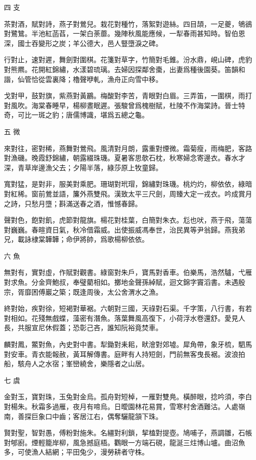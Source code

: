 \documentclass[12pt,a4paper]{ctexbook}
\begin{document}
四 支\par
茶對酒，賦對詩，燕子對鶯兒。栽花對種竹，落絮對遊絲。四目頡，一足夔，鴝鵒對鷺鷥。半池紅菡萏，一架白荼蘼。幾陣秋風能應候，一犁春雨甚知時。智伯恩深，國士吞變形之炭；羊公德大，邑人豎墮淚之碑。\par
行對止，速對遲，舞劍對圍棋。花箋對草字，竹簡對毛錐。汾水鼎，峴山碑，虎豹對熊羆。花開紅錦繡，水漾碧琉璃。去婦因探鄰舍棗，出妻爲種後園葵。笛韻和諧，仙管恰從雲裏降；櫓聲咿軋，漁舟正向雪中移。\par
戈對甲，鼓對旗，紫燕對黃鸝。梅酸對李苦，青眼對白眉。三弄笛，一圍棋，雨打對風吹。海棠春睡早，楊柳晝眠遲。張駿曾爲槐樹賦，杜陵不作海棠詩。晉士特奇，可比一斑之豹；唐儒博識，堪爲五總之龜。\par
五 微\par
來對往，密對稀，燕舞對鶯飛。風清對月朗，露重對煙微。霜菊瘦，雨梅肥，客路對漁磯。晚霞舒錦繡，朝露綴珠璣。夏暑客思欹石枕，秋寒婦念寄邊衣。春水才深，青草岸邊漁父去；夕陽半落，綠莎原上牧童歸。\par
寬對猛，是對非，服美對乘肥。珊瑚對玳瑁，錦繡對珠璣。桃灼灼，柳依依，綠暗對紅稀。窗前鶯並語，簾外燕雙飛。漢致太平三尺劍，周臻大定一戎衣。吟成賞月之詩，只愁月墮；斟滿送春之酒，惟憾春歸。\par
聲對色，飽對飢，虎節對龍旗。楊花對桂葉，白簡對朱衣。尨也吠，燕于飛，蕩蕩對巍巍。春暄資日氣，秋冷借霜威。出使振威馮奉世，治民異等尹翁歸。燕我弟兄，載詠棣棠韡韡；命伊將帥，爲歌楊柳依依。\par
六 魚\par
無對有，實對虛，作賦對觀書。綠窗對朱戶，寶馬對香車。伯樂馬，浩然驢，弋雁對求魚。分金齊鮑叔，奉璧藺相如。擲地金聲孫綽賦，迴文錦字竇滔書。未遇殷宗，胥靡困傅巖之築；既逢周後，太公舍渭水之漁。\par
終對始，疾對徐，短褐對華裾。六朝對三國，天祿對石渠。千字策，八行書，有若對相如。花殘無戲蝶，藻密有潛魚。落葉舞風高復下，小荷浮水卷還舒。愛見人長，共服宣尼休假蓋；恐彰己吝，誰知阮裕竟焚車。\par
麟對鳳，鱉對魚，內史對中書。犁鋤對耒耜，畎澮對郊墟。犀角帶，象牙梳，駟馬對安車。青衣能報赦，黃耳解傳書。庭畔有人持短劍，門前無客曳長裾。波浪拍船，駭舟人之水宿；峯巒繞舍，樂隱者之山居。\par
七 虞\par
金對玉，寶對珠，玉兔對金烏。孤舟對短棹，一雁對雙鳧。橫醉眼，捻吟須，李白對楊朱。秋霜多過雁，夜月有啼烏。日曖園林花易賞，雪寒村舍酒難沽。人處嶺南，善探巨象口中齒；客居江右，偶奪驪龍頷下珠。\par
賢對聖，智對愚，傅粉對施朱。名繮對利鎖，挈榼對提壺。鳩哺子，燕調雛，石帳對郇廚。煙輕籠岸柳，風急撼庭梧。鸜眼一方端石硯，龍涎三炷博山壚。曲沼魚多，可使漁人結網；平田兔少，漫勞耕者守株。\par
\end{document}
